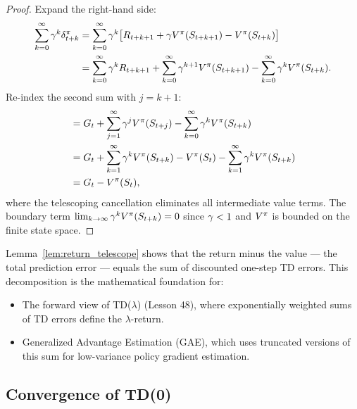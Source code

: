 \documentclass[11pt,a4paper]{article}
\begin{document}
\begin{proof}
Expand the right-hand side:
\begin{align}
  \sum_{k=0}^{\infty} \gamma^k \delta_{t+k}^\pi
  &= \sum_{k=0}^{\infty} \gamma^k
     \bigl[R_{t+k+1} + \gamma V^{\pi}(S_{t+k+1})
     - V^{\pi}(S_{t+k})\bigr] \nonumber\\
  &= \sum_{k=0}^{\infty} \gamma^k R_{t+k+1}
     + \sum_{k=0}^{\infty} \gamma^{k+1} V^{\pi}(S_{t+k+1})
     - \sum_{k=0}^{\infty} \gamma^k V^{\pi}(S_{t+k}).
     \label{eq:telescope_expand}
\end{align}
Re-index the second sum with $j = k + 1$:
\begin{align}
  &= G_t
     + \sum_{j=1}^{\infty} \gamma^j V^{\pi}(S_{t+j})
     - \sum_{k=0}^{\infty} \gamma^k V^{\pi}(S_{t+k}) \nonumber\\
  &= G_t
     + \sum_{k=1}^{\infty} \gamma^k V^{\pi}(S_{t+k})
     - V^{\pi}(S_t)
     - \sum_{k=1}^{\infty} \gamma^k V^{\pi}(S_{t+k}) \nonumber\\
  &= G_t - V^{\pi}(S_t),
  \label{eq:telescope_final}
\end{align}
where the telescoping cancellation eliminates all intermediate value
terms. The boundary term $\lim_{k \to \infty} \gamma^k V^{\pi}(S_{t+k})
= 0$ since $\gamma < 1$ and $V^{\pi}$ is bounded on the finite state
space.
\end{proof}

\begin{rlconnection}[title={TD Errors as Prediction Errors}]
Lemma~\ref{lem:return_telescope} shows that the return minus the value
--- the total prediction error --- equals the sum of discounted one-step
TD errors. This decomposition is the mathematical foundation for:
\begin{itemize}[nosep]
  \item The forward view of TD($\lambda$) (Lesson 48), where
    exponentially weighted sums of TD errors define the $\lambda$-return.
  \item Generalized Advantage Estimation (GAE), which uses truncated
    versions of this sum for low-variance policy gradient estimation.
\end{itemize}
\end{rlconnection}

\subsection{Convergence of TD(0)}
\label{subsec:td0_convergence}
\end{document}
